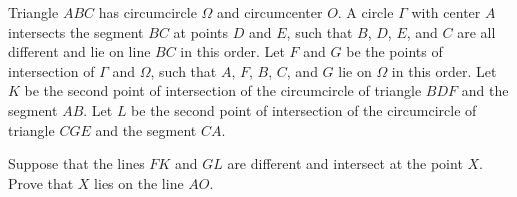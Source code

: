 Triangle 
$ABC$
 has circumcircle 
$\Omega$
 and circumcenter 
$O$.
 A circle 
$\Gamma$
 with center 
$A$
 intersects the segment 
$BC$
 at points 
$D$
 and 
$E$, 
 such that 
$B$, 
$D$, 
$E$, 
 and 
$C$
 are all different and lie on line 
$BC$
 in this order. Let 
$F$
 and 
$G$
 be the points of intersection of 
$\Gamma$
 and 
$\Omega$, 
 such that 
$A$, 
$F$, 
$B$, 
$C$, 
 and 
$G$
 lie on 
$\Omega$
 in this order. Let 
$K$
 be the second point of intersection of the circumcircle of triangle 
$BDF$
 and the segment 
$AB$.
 Let 
$L$
 be the second point of intersection of the circumcircle of triangle 
$CGE$
 and the segment 
$CA$.


Suppose that the lines 
$FK$
 and 
$GL$
 are different and intersect at the point 
$X$.
 Prove that 
$X$
 lies on the line 
$AO$.
